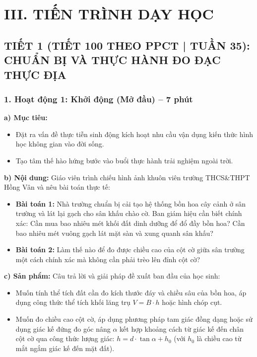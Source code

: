 \documentclass[12pt, a4paper]{article}
\begin{document}
\section*{III. TIẾN TRÌNH DẠY HỌC}

\subsection*{TIẾT 1 (TIẾT 100 THEO PPCT | TUẦN 35): CHUẨN BỊ VÀ THỰC HÀNH ĐO ĐẠC THỰC ĐỊA}

\subsubsection*{1. Hoạt động 1: Khởi động (Mở đầu) -- 7 phút}

\noindent \textbf{a) Mục tiêu:}
\begin{itemize}[leftmargin=0.6cm]
    \item Đặt ra vấn đề thực tiễn sinh động kích hoạt nhu cầu vận dụng kiến thức hình học không gian vào đời sống.
    \item Tạo tâm thế hào hứng bước vào buổi thực hành trải nghiệm ngoài trời.
\end{itemize}

\noindent \textbf{b) Nội dung:}
Giáo viên trình chiếu hình ảnh khuôn viên trường THCS\&THPT Hồng Vân và nêu bài toán thực tế:
\begin{itemize}[leftmargin=0.6cm]
    \item \textbf{Bài toán 1:} Nhà trường chuẩn bị cải tạo hệ thống bồn hoa cây cảnh ở sân trường và lát lại gạch cho sân khấu chào cờ. Ban giám hiệu cần biết chính xác: Cần mua bao nhiêu mét khối đất dinh dưỡng để đổ đầy bồn hoa? Cần bao nhiêu mét vuông gạch lát mặt sàn và xung quanh sân khấu?
    \item \textbf{Bài toán 2:} Làm thế nào để đo được chiều cao của cột cờ giữa sân trường một cách chính xác mà không cần phải trèo lên đỉnh cột cờ?
\end{itemize}

\noindent \textbf{c) Sản phẩm:}
Câu trả lời và giải pháp đề xuất ban đầu của học sinh:
\begin{itemize}[leftmargin=0.6cm]
    \item Muốn tính thể tích đất cần đo kích thước đáy và chiều sâu của bồn hoa, áp dụng công thức thể tích khối lăng trụ $V = B \cdot h$ hoặc hình chóp cụt.
    \item Muốn đo chiều cao cột cờ, áp dụng phương pháp tam giác đồng dạng hoặc sử dụng giác kế đứng đo góc nâng $\alpha$ kết hợp khoảng cách từ giác kế đến chân cột cờ qua công thức lượng giác: $h = d \cdot \tan\alpha + h_0$ (với $h_0$ là chiều cao từ mắt ngắm giác kế đến mặt đất).
\end{itemize}
\end{document}
